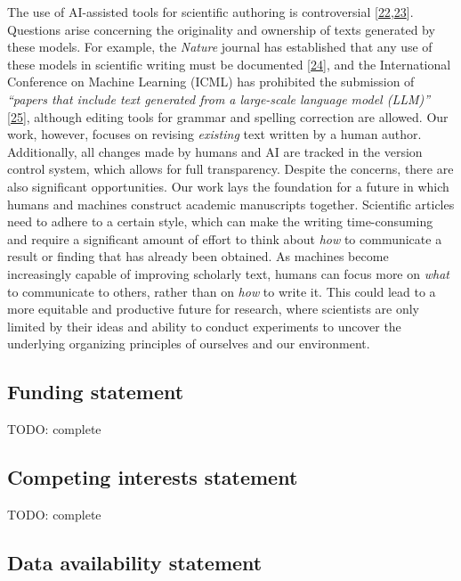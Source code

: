 \documentclass[
]{article}
\begin{document}
The use of AI-assisted tools for scientific authoring is controversial {[}\protect\hyperlink{ref-1EAonKBXJ}{22},\protect\hyperlink{ref-KJTJqmxc}{23}{]}.
Questions arise concerning the originality and ownership of texts generated by these models.
For example, the \emph{Nature} journal has established that any use of these models in scientific writing must be documented {[}\protect\hyperlink{ref-wQLVc4o7}{24}{]}, and the International Conference on Machine Learning (ICML) has prohibited the submission of \emph{``papers that include text generated from a large-scale language model (LLM)''} {[}\protect\hyperlink{ref-K58CKD6D}{25}{]}, although editing tools for grammar and spelling correction are allowed.
Our work, however, focuses on revising \emph{existing} text written by a human author.
Additionally, all changes made by humans and AI are tracked in the version control system, which allows for full transparency.
Despite the concerns, there are also significant opportunities.
Our work lays the foundation for a future in which humans and machines construct academic manuscripts together.
Scientific articles need to adhere to a certain style, which can make the writing time-consuming and require a significant amount of effort to think about \emph{how} to communicate a result or finding that has already been obtained.
As machines become increasingly capable of improving scholarly text, humans can focus more on \emph{what} to communicate to others, rather than on \emph{how} to write it.
This could lead to a more equitable and productive future for research, where scientists are only limited by their ideas and ability to conduct experiments to uncover the underlying organizing principles of ourselves and our environment.

\hypertarget{funding-statement}{%
\subsection{Funding statement}\label{funding-statement}}

TODO: complete

\hypertarget{competing-interests-statement}{%
\subsection{Competing interests statement}\label{competing-interests-statement}}

TODO: complete

\hypertarget{data-availability-statement}{%
\subsection{Data availability statement}\label{data-availability-statement}}
\end{document}
